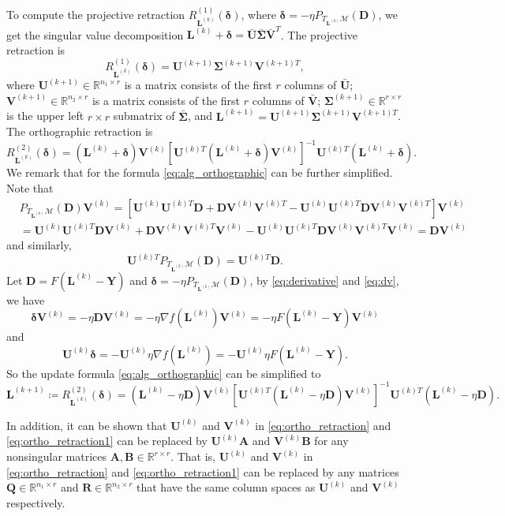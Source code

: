 \documentclass[12pt]{article}
\newcommand{\grad}{\nabla}
\newcommand{\bL}{\boldsymbol{L}}
\newcommand{\bQ}{\boldsymbol{Q}}
\newcommand{\bD}{\boldsymbol{D}}
\newcommand{\bSigma}{\boldsymbol\Sigma}
\newcommand{\bU}{\boldsymbol{U}}
\newcommand{\bV}{\boldsymbol{V}}
\def\reals{\mathbb{R}}
\def\bQ{\boldsymbol{Q}}
\def\bSigma{\boldsymbol\Sigma}
\def\bU{\boldsymbol{U}}
\def\bR{\boldsymbol{R}}
\def\bA{\boldsymbol{A}}
\def\bY{\boldsymbol{Y}}
\def\bB{\boldsymbol{B}}
\def\calM{\mathcal{M}}
\def\bd{\boldsymbol{\delta}}
\theoremstyle{plain}
\theoremstyle{definition}
\theoremstyle{plain}
\theoremstyle{plain}
\theoremstyle{remark}
\begin{document}
To compute the projective retraction $R^{(1)}_{\bL^{(k)}}(\bd)$, where $\bd=-\eta P_{T_{\bL^{(k)}}\calM}(\bD)$, we get the singular value decomposition $\bL^{(k)}+\bd=\bar{\bU}\bar{\bSigma}\bar{\bV}^T$. The projective retraction is
 \[
 R^{(1)}_{\bL^{(k)}}(\bd)=\bU^{(k+1)}\bSigma^{(k+1)}\bV^{(k+1)T},
 \]
where $\bU^{(k+1)}\in\reals^{n_1\times r}$ is a matrix consists of the first $r$ columns of $\bar{\bU}$; $\bV^{(k+1)}\in\reals^{n_2\times r}$ is a matrix consists of the first $r$ columns of $\bar{\bV}$; $\bSigma^{(k+1)}\in\reals^{r\times r}$ is the upper left $r\times r$ submatrix of $\bar{\bSigma}$, and $\bL^{(k+1)}=\bU^{(k+1)}\bSigma^{(k+1)}\bV^{(k+1)T}$. The orthographic retraction is
 \begin{equation}\label{eq:ortho_retraction}
 R^{(2)}_{\bL^{(k)}}(\bd)=(\bL^{(k)}+\bd)\bV^{(k)}[\bU^{(k)T}(\bL^{(k)}+\bd)\bV^{(k)}]^{-1}\bU^{(k)T}(\bL^{(k)}+\bd).
 \end{equation}
We remark that for the formula \eqref{eq:alg_orthographic} can be further simplified. Note that
\begin{align}\label{eq:dv}
&P_{T_{\bL^{(k)}}\calM}(\bD)\bV^{(k)}=[\bU^{(k)}\bU^{(k)T}\bD+
 \bD\bV^{(k)}\bV^{(k)T}-\bU^{(k)}\bU^{(k)T}\bD\bV^{(k)}\bV^{(k)T}]\bV^{(k)}\nonumber\\
 &=\bU^{(k)}\bU^{(k)T}\bD\bV^{(k)}+\bD\bV^{(k)}\bV^{(k)T}\bV^{(k)}-\bU^{(k)}\bU^{(k)T}\bD\bV^{(k)}\bV^{(k)T}{ \bV^{(k)}} =\bD\bV^{(k)}
\end{align}
and similarly,
\[
\bU^{(k)T}P_{T_{\bL^{(k)}}\calM}(\bD)=\bU^{(k)T}\bD.
\]
Let $\bD=F(\bL^{(k)}-\bY)$ and $\bd=-\eta P_{T_{\bL^{(k)}}\calM}(\bD)$, by \eqref{eq:derivative} and \eqref{eq:dv}, we have \[\bd\bV^{(k)}=-\eta\bD\bV^{(k)}=-\eta\grad f(\bL^{(k)})\bV^{(k)}=-\eta F(\bL^{(k)}-\bY)\bV^{(k)}\]
and
\[\bU^{(k)}\bd=-\bU^{(k)}\eta\grad f(\bL^{(k)})=-\bU^{(k)}\eta F(\bL^{(k)}-\bY).\]
So the update formula \eqref{eq:alg_orthographic} can be simplified to
\begin{equation}\label{eq:ortho_retraction1}
\bL^{(k+1)}\coloneqq R_{\bL^{(k)}}^{(2)}(\bd)
=(\bL^{(k)}-\eta \bD)\bV^{(k)}[\bU^{(k)T}(\bL^{(k)}-\eta \bD)\bV^{(k)}]^{-1}\bU^{(k)T}(\bL^{(k)}-\eta \bD).
\end{equation}

In addition, it can be shown that $\bU^{(k)}$ and $\bV^{(k)}$ in \eqref{eq:ortho_retraction} and \eqref{eq:ortho_retraction1} can be replaced by $\bU^{(k)}\bA$  and $\bV^{(k)}\bB$ for any nonsingular matrices $\bA,\bB\in\reals^{r\times r}$. That is,  $\bU^{(k)}$ and $\bV^{(k)}$ in \eqref{eq:ortho_retraction} {and \eqref{eq:ortho_retraction1}} can be replaced by any matrices $\bQ\in\reals^{n_1\times r}$ and $\bR\in\reals^{n_2\times r}$ that have the same column spaces as $\bU^{(k)}$ and $\bV^{(k)}$ respectively.
\end{document}
